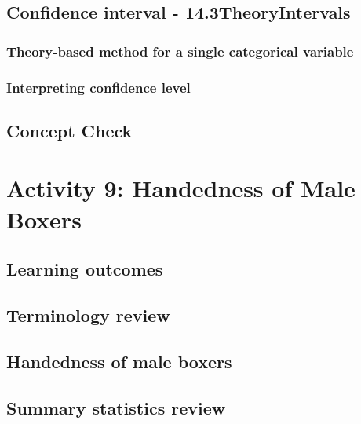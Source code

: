 \documentclass[
]{report}
\begin{document}
\subsection*{Confidence interval - 14.3TheoryIntervals}\label{confidence-interval---14.3theoryintervals}

\subsubsection*{Theory-based method for a single categorical variable}\label{theory-based-method-for-a-single-categorical-variable}

\subsubsection*{Interpreting confidence level}\label{interpreting-confidence-level}

\subsection{Concept Check}\label{concept-check-4}

\section{Activity 9: Handedness of Male Boxers}\label{activity-9-handedness-of-male-boxers}

\subsection{Learning outcomes}\label{learning-outcomes-8}

\subsection{Terminology review}\label{terminology-review-7}

\subsection{Handedness of male boxers}\label{handedness-of-male-boxers}

\subsection{Summary statistics review}\label{summary-statistics-review}
\end{document}
